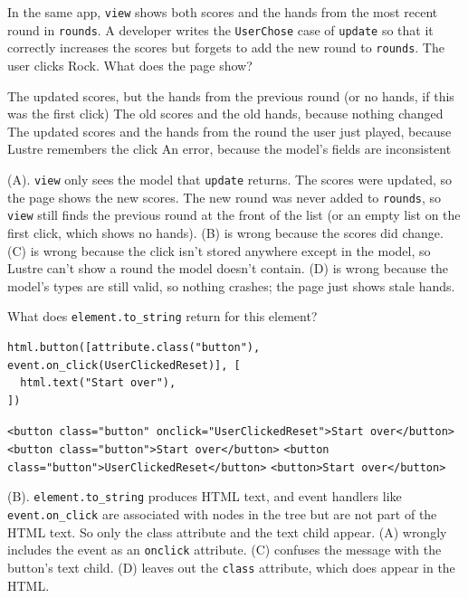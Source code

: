 \begin{blocksection}
\question In the same app, \lstinline$view$ shows both scores and the hands from the most recent round in \lstinline$rounds$. A developer writes the \lstinline$UserChose$ case of \lstinline$update$ so that it correctly increases the scores but forgets to add the new round to \lstinline$rounds$. The user clicks Rock. What does the page show?

\begin{choices}
\choice The updated scores, but the hands from the previous round (or no hands, if this was the first click)
\choice The old scores and the old hands, because nothing changed
\choice The updated scores and the hands from the round the user just played, because Lustre remembers the click
\choice An error, because the model's fields are inconsistent
\end{choices}

\begin{solution}
(A). \lstinline$view$ only sees the model that \lstinline$update$ returns. The scores were updated, so the page shows the new scores. The new round was never added to \lstinline$rounds$, so \lstinline$view$ still finds the previous round at the front of the list (or an empty list on the first click, which shows no hands).
(B) is wrong because the scores did change.
(C) is wrong because the click isn't stored anywhere except in the model, so Lustre can't show a round the model doesn't contain.
(D) is wrong because the model's types are still valid, so nothing crashes; the page just shows stale hands.
\end{solution}
\end{blocksection}

\begin{blocksection}
\question What does \lstinline$element.to_string$ return for this element?

\begin{lstlisting}
html.button([attribute.class("button"), event.on_click(UserClickedReset)], [
  html.text("Start over"),
])
\end{lstlisting}

\begin{choices}
\choice \lstinline$<button class="button" onclick="UserClickedReset">Start over</button>$
\choice \lstinline$<button class="button">Start over</button>$
\choice \lstinline$<button class="button">UserClickedReset</button>$
\choice \lstinline$<button>Start over</button>$
\end{choices}

\begin{solution}
(B). \lstinline$element.to_string$ produces HTML text, and event handlers like \lstinline$event.on_click$ are associated with nodes in the tree but are not part of the HTML text. So only the class attribute and the text child appear.
(A) wrongly includes the event as an \lstinline$onclick$ attribute.
(C) confuses the message with the button's text child.
(D) leaves out the \lstinline$class$ attribute, which does appear in the HTML.
\end{solution}
\end{blocksection}